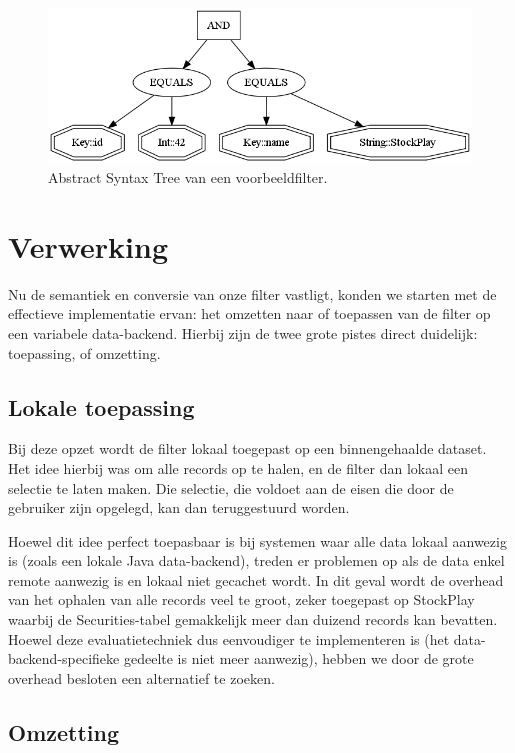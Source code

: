 \begin{figure}[h!]
	\centering
		\includegraphics[width=\textwidth]{images/realisatie/AST}
	\caption{Abstract Syntax Tree van een voorbeeldfilter.}
\end{figure}


\section{Verwerking}

Nu de semantiek en conversie van onze filter vastligt, konden we starten met de effectieve implementatie ervan: het omzetten naar of toepassen van de filter op een variabele data-backend. Hierbij zijn de twee grote pistes direct duidelijk: toepassing, of omzetting.

\subsection{Lokale toepassing}

Bij deze opzet wordt de filter lokaal toegepast op een binnengehaalde dataset. Het idee hierbij was om alle records op te halen, en de filter dan lokaal een selectie te laten maken. Die selectie, die voldoet aan de eisen die door de gebruiker zijn opgelegd, kan dan teruggestuurd worden.

Hoewel dit idee perfect toepasbaar is bij systemen waar alle data lokaal aanwezig is (zoals een lokale Java data-backend), treden er problemen op als de data enkel remote aanwezig is en lokaal niet gecachet wordt. In dit geval wordt de overhead van het ophalen van alle records veel te groot, zeker toegepast op StockPlay waarbij de Securities-tabel gemakkelijk meer dan duizend records kan bevatten. Hoewel deze evaluatietechniek dus eenvoudiger te implementeren is (het data-backend-specifieke gedeelte is niet meer aanwezig), hebben we door de grote overhead besloten een alternatief te zoeken.

\subsection{Omzetting}

